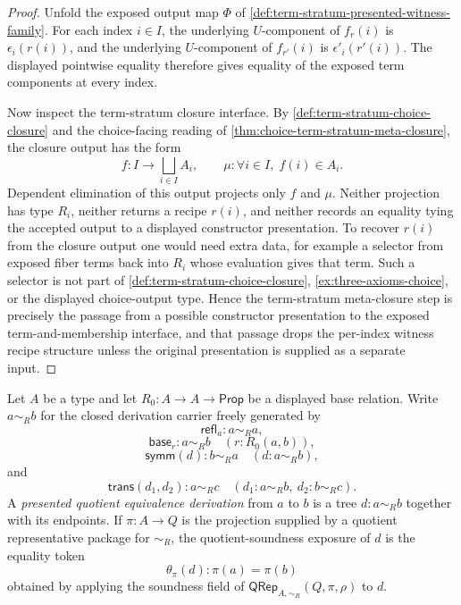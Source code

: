 \begin{proof}
Unfold the exposed output map $\Phi$ of \autoref{def:term-stratum-presented-witness-family}. For each index $i\in I$, the underlying $U$-component of $f_r(i)$ is $\epsilon_i(r(i))$, and the underlying $U$-component of $f_{r'}(i)$ is $\epsilon'_i(r'(i))$. The displayed pointwise equality therefore gives equality of the exposed term components at every index.

Now inspect the term-stratum closure interface. By \autoref{def:term-stratum-choice-closure} and the choice-facing reading of \autoref{thm:choice-term-stratum-meta-closure}, the closure output has the form
$$
f:I\to\bigsqcup_{i\in I}A_i,
\qquad
\mu:\forall i\in I,\;f(i)\in A_i.
$$
Dependent elimination of this output projects only $f$ and $\mu$. Neither projection has type $R_i$, neither returns a recipe $r(i)$, and neither records an equality tying the accepted output to a displayed constructor presentation. To recover $r(i)$ from the closure output one would need extra data, for example a selector from exposed fiber terms back into $R_i$ whose evaluation gives that term. Such a selector is not part of \autoref{def:term-stratum-choice-closure}, \autoref{ex:three-axioms-choice}, or the displayed choice-output type. Hence the term-stratum meta-closure step is precisely the passage from a possible constructor presentation to the exposed term-and-membership interface, and that passage drops the per-index witness recipe structure unless the original presentation is supplied as a separate input.
\end{proof}


\begin{definition}
\label{def:presented-quotient-equivalence-derivation}
Let $A$ be a type and let $R_0:A\to A\to\mathsf{Prop}$ be a displayed base relation. Write $a\sim_R b$ for the closed derivation carrier freely generated by
$$
\mathsf{refl}_a:a\sim_R a,
$$
$$
\mathsf{base}_r:a\sim_R b\quad(r:R_0(a,b)),
$$
$$
\mathsf{symm}(d):b\sim_R a\quad(d:a\sim_R b),
$$
and
$$
\mathsf{trans}(d_1,d_2):a\sim_R c\quad(d_1:a\sim_R b,\ d_2:b\sim_R c).
$$
A \emph{presented quotient equivalence derivation} from $a$ to $b$ is a tree $d:a\sim_R b$ together with its endpoints. If $\pi:A\to Q$ is the projection supplied by a quotient representative package for $\sim_R$, the quotient-soundness exposure of $d$ is the equality token
$$
\theta_\pi(d):\pi(a)=\pi(b)
$$
obtained by applying the soundness field of $\mathsf{QRep}_{A,\sim_R}(Q,\pi,\rho)$ to $d$.
\end{definition}

